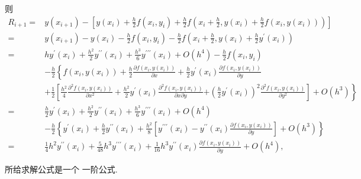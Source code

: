 \begin{tcolorbox}
则
$$
\begin{aligned}
R_{i+1}= & y\left(x_{i+1}\right)-\left[y\left(x_{i}\right)+\frac h2 f(x_i,y_i)+\frac h2 f\left(x_{i}+\frac{h}{2}, y\left(x_{i}\right)+\frac{h}{2} f\left(x_{i}, y\left(x_{i}\right)\right)\right)\right] \\
= & y\left(x_{i+1}\right)-y\left(x_{i}\right)-\frac h2 f(x_i,y_i)-\frac h2 f\left(x_{i}+\frac{h}{2}, y\left(x_{i}\right)+\frac{h}{2} y^{\prime}\left(x_{i}\right)\right) \\
= & h y^{\prime}\left(x_{i}\right)+\frac{h^{2}}{2} y^{\prime \prime}\left(x_{i}\right)+\frac{h^{3}}{6} y^{\prime \prime \prime}\left(x_{i}\right)+O\left(h^{4}\right)-\frac h2 f(x_i,y_i) \\
& -\frac h2\left\{f\left(x_{i}, y\left(x_{i}\right)\right)+\frac{h}{2} \frac{\partial f\left(x_{i}, y\left(x_{i}\right)\right)}{\partial x}+\frac{h}{2} y^{\prime}\left(x_{i}\right) \frac{\partial f\left(x_{i}, y\left(x_{i}\right)\right)}{\partial y}\right. \\
& +\frac{1}{2}\left[\frac{h^{2}}{4} \frac{\partial^{2} f\left(x_{i}, y\left(x_{i}\right)\right)}{\partial x^{2}}+\frac{h^{2}}{2} y^{\prime}\left(x_{i}\right) \frac{\partial^{2} f\left(x_{i}, y\left(x_{i}\right)\right)}{\partial x \partial y}\right.  \left.\left.+\left(\frac{h}{2} y^{\prime}\left(x_{i}\right)\right)^{2} \frac{\partial^{2} f\left(x_{i}, y\left(x_{i}\right)\right)}{\partial y^{2}}\right]+O\left(h^{3}\right)\right\} \\
= & \frac h2 y^{\prime}\left(x_{i}\right)+\frac{h^{2}}{2} y^{\prime \prime}\left(x_{i}\right)+\frac{h^{3}}{6} y^{\prime \prime \prime}\left(x_{i}\right)+O\left(h^{4}\right) \\
& -\frac h2\left\{y^{\prime}\left(x_{i}\right)+\frac{h}{2} y^{\prime \prime}\left(x_{i}\right)+\frac{h^{2}}{8}\left[y^{\prime \prime \prime}\left(x_{i}\right)-y^{\prime \prime}\left(x_{i}\right) \frac{\partial f\left(x_{i}, y\left(x_{i}\right)\right)}{\partial y}\right]+O\left(h^{3}\right)\right\} \\
= &\frac 14 h^2y^{\prime \prime}\left(x_{i}\right)+ \frac{5}{48}h^3 y^{\prime \prime \prime}\left(x_{i}\right)+\frac{1}{16}h^3 y^{\prime \prime}\left(x_{i}\right) \frac{\partial f\left(x_{i}, y\left(x_{i}\right)\right)}{\partial y}+O\left(h^{4}\right),
\end{aligned}
$$

所给求解公式是一个 一阶公式.

  \end{tcolorbox}


